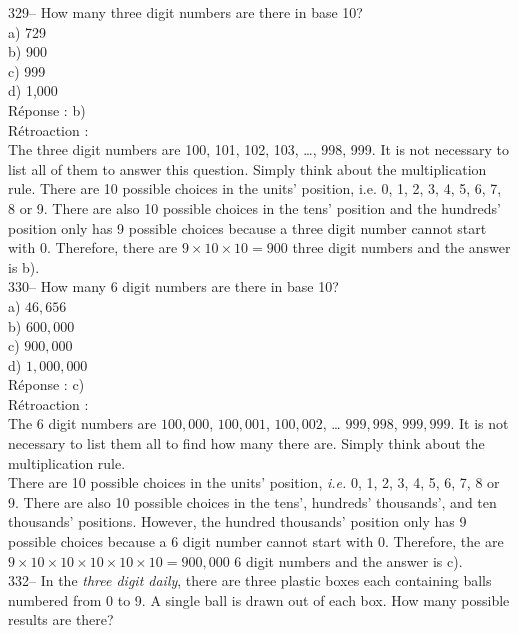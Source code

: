 \documentclass[letterpaper, 12pt]{article}
\begin{document}
329-- How many three digit numbers are there in base 10?\\

a) 729\\
b) 900\\
c) 999\\
d) 1,000\\

R\'eponse : b)\\

R\'etroaction : \\
The three digit numbers are 100, 101, 102, 103, \ldots , 998, 999.
It is not necessary to list all of them to answer this question. Simply think about the multiplication rule. There are 10 possible choices in the units' position, i.e. 0, 1, 2, 3, 4, 5, 6, 7, 8 or 9. There are also 10 possible choices in the tens' position and the hundreds' position only has 9 possible choices because a three digit number cannot start with 0. Therefore, there are $9\times10\times10=900$ three digit numbers and the answer is b).\\


330-- How many 6 digit numbers are there in base 10?\\

a) $46,656$\\
b) $600,000$\\
c) $900,000$\\
d) $1,000,000$\\

R\'eponse : c)\\

R\'etroaction : \\
The 6 digit numbers are $100,000$,  $100,001$, $100,002$, \ldots
  $999,998$,  $999,999$. It is not necessary to list them all to find how many there are. Simply think about the multiplication rule.\\
There are 10 possible choices in the units' position, \emph{i.e.} 0,
1, 2, 3, 4, 5, 6, 7, 8 or 9. There are also 10 possible choices in
the tens', hundreds' thousands', and ten thousands' positions.
However, the hundred thousands' position only has 9 possible choices because a 6 digit number cannot start with 0. Therefore, the are $9\times10\times10\times10\times10\times10=900,000$ 6 digit numbers and the answer is c).\\


332-- In the \emph{three digit daily}, there are three plastic boxes
each containing balls numbered from 0 to 9. A single ball is drawn
out of each box.
How many possible results are there?\\
\end{document}
